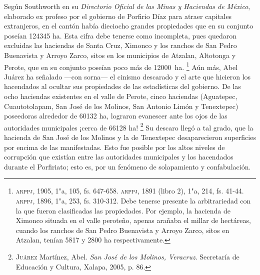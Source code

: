 \documentclass[14pt,twoside,final]{extbook} %
\let\oldfootnote\footnote
\renewcommand\footnote[1]{%
\oldfootnote{\hspace{1mm}#1}}
\begin{document}
Según Southworth en su \emph{Directorio Oficial de las Minas y Haciendas de México}, elaborado ex profeso por el gobierno de Porfirio Díaz para atraer capitales extranjeros, en el cantón había dieciocho grandes propiedades que en su conjunto poseían 124345 ha. Esta cifra debe tenerse como incompleta, pues quedaron excluidas las haciendas de Santa Cruz, Ximonco y los ranchos de San Pedro Buenavista y Arroyo Zarco, sitos en los municipios de Atzalan, Altotonga y Perote, que en su conjunto poseían poco más de 12000~ha.\footnote{\textsc{arppj}, 1905, 1"a, 105, fs. 647-658. \textsc{arppj}, 1891 (libro 2), 1"a, 214, fs. 41-44. \textsc{arppj}, 1896, 1"a, 253, fs. 310-312. Debe tenerse presente la arbitrariedad con la que fueron clasificadas las propiedades. Por ejemplo, la hacienda de Ximonco situada en el valle peroteño, apenas arañaba el millar de hectáreas, cuando los ranchos de San Pedro Buenavista y Arroyo Zarco, sitos en Atzalan, tenían 5817 y 2800 ha respectivamente.} Aún más, Abel Juárez ha señalado ---con sorna--- el cinismo descarado y el arte que hicieron los hacendados al ocultar sus propiedades de las estadísticas del gobierno. De las ocho haciendas existentes en el valle de Perote, cinco haciendas (Aguatepec, Cuautotolapam, San José de los Molinos, San Antonio Limón y Tenextepec) poseedoras alrededor de 60132 ha, lograron evanescer ante los ojos de las autoridades municipales ¡cerca de 66128 ha!\footnote{\textsc{Juárez} Martínez, Abel. \emph{San José de los Molinos, Veracruz}. Secretaría de Educación y Cultura, Xalapa, 2005, p. 86.} Su descaro llegó a tal grado, que la hacienda de San José de los Molinos y la de Tenextepec desaparecieron superficies por encima de las manifestadas. Esto fue posible por los altos niveles de corrupción que existían entre las autoridades municipales y los hacendados durante el Porfiriato; esto es, por un fenómeno de solapamiento y confabulación.
\end{document}
